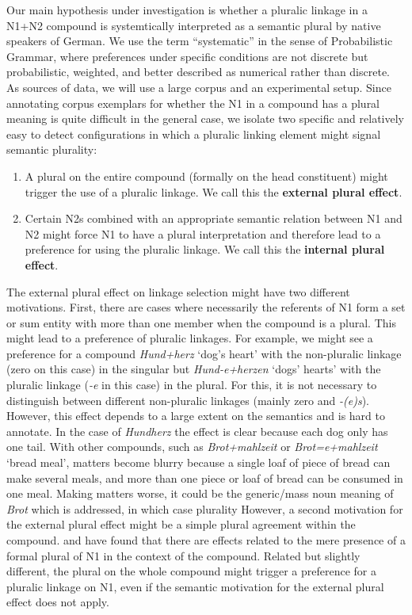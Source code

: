 Our main hypothesis under investigation is whether a pluralic linkage in a N1+N2 compound is systemtically interpreted as a semantic plural by native speakers of German.
We use the term ``systematic'' in the sense of Probabilistic Grammar, where preferences under specific conditions are not discrete but probabilistic, weighted, and better described as numerical rather than discrete.
As sources of data, we will use a large corpus and an experimental setup.
Since annotating corpus exemplars for whether the N1 in a compound has a plural meaning is quite difficult in the general case, we isolate two specific and relatively easy to detect configurations in which a pluralic linking element might signal semantic plurality:

\vspace{\baselineskip}

\begin{enumerate}
  \item A plural on the entire compound (formally on the head constituent) might trigger the use of a pluralic linkage.
  We call this the \textbf{external plural effect}.
  \item Certain N2s combined with an appropriate semantic relation between N1 and N2 might force N1 to have a plural interpretation and therefore lead to a preference for using the pluralic linkage.
  We call this the \textbf{internal plural effect}.
\end{enumerate}

\vspace{\baselineskip}

The external plural effect on linkage selection might have two different motivations.
First, there are cases where necessarily the referents of N1 form a set or sum entity with more than one member when the compound is a plural.
This might lead to a preference of pluralic linkages.
For example, we might see a preference for a compound \textit{Hund+herz} `dog's heart' with the non-pluralic linkage (zero on this case) in the singular but \textit{Hund-e+herzen} `dogs' hearts' with the pluralic linkage (\textit{-e} in this case) in the plural.
For this, it is not necessary to distinguish between different non-pluralic linkages (mainly zero and \textit{-(e)s}).
However, this effect depends to a large extent on the semantics and is hard to annotate.
In the case of \textit{Hundherz} the effect is clear because each dog only has one tail.
With other compounds, such as \textit{Brot+mahlzeit} or \textit{Brot=e+mahlzeit} `bread meal', matters become blurry because a single loaf of piece of bread can make several meals, and more than one piece or loaf of bread can be consumed in one meal.
Making matters worse, it could be the generic\slash mass noun meaning of \textit{Brot} which is addressed, in which case plurality
However, a second motivation for the external plural effect might be a simple plural agreement within the compound.
\textcite{BangaEa2013a} and \textcite{BangaEa2013b} have found that there are effects related to the mere presence of a formal plural of N1 in the context of the compound.
Related but slightly different, the plural on the whole compound might trigger a preference for a pluralic linkage on N1, even if the semantic motivation for the external plural effect does not apply.

